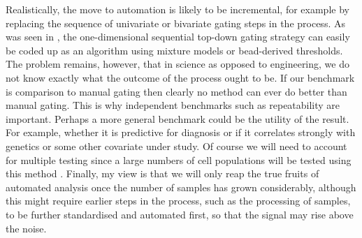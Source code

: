 Realistically, the move to automation is likely to be incremental, for example by replacing the sequence of univariate or bivariate gating steps in the process.
As was seen in , the one-dimensional sequential top-down gating strategy can easily be coded up as an algorithm using mixture models or bead-derived thresholds.  
The problem remains, however, that in science as opposed to engineering, we do not know exactly what the outcome of the process ought to be.
If our benchmark is comparison to manual gating then clearly no method can ever do better than manual gating.
This is why independent benchmarks such as repeatability are important.
Perhaps a more general benchmark could be the utility of the result.
For example, whether it is predictive for diagnosis or if it correlates strongly with genetics or some other covariate under study.
Of course we will need to account for multiple testing since a large numbers of cell populations will be tested using this method \citep{Roederer:2015eu}.
Finally, my view is that we will only reap the true fruits of automated analysis once the number of samples has grown considerably, although this might require earlier steps in the process, such as the processing of samples, to be further standardised and automated first, so that the signal may rise above the noise.





%
%









